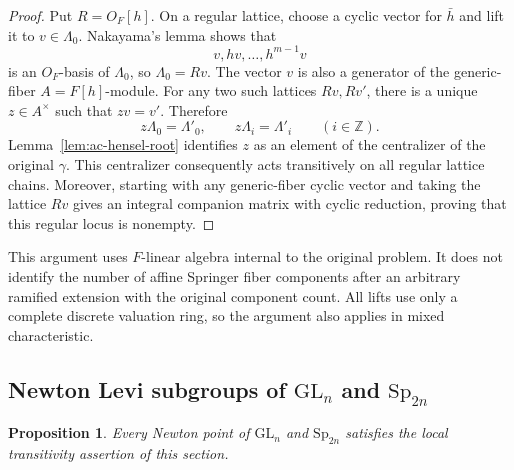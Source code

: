 \documentclass[11pt,a4paper]{article}
\newtheorem{proposition}[theorem]{Proposition}
\theoremstyle{definition}
\theoremstyle{remark}
\begin{document}
\begin{proof}
Put \(R=O_F[h]\). On a regular lattice, choose a cyclic vector for
\(\bar h\) and lift it to \(v\in\Lambda_0\). Nakayama's lemma shows that
\[
v,hv,\ldots,h^{m-1}v
\]
is an \(O_F\)-basis of \(\Lambda_0\), so \(\Lambda_0=Rv\). The vector \(v\)
is also a generator of the generic-fiber \(A=F[h]\)-module. For any two
such lattices \(Rv,Rv'\), there is a unique \(z\in A^\times\) such that
\(zv=v'\). Therefore
\[
z\Lambda_0=\Lambda'_0,\qquad
z\Lambda_i=\Lambda'_i\qquad(i\in\mathbb Z).
\]
Lemma~\ref{lem:ac-hensel-root} identifies \(z\) as an element of the
centralizer of the original \(\gamma\). This centralizer consequently
acts transitively on all regular lattice chains. Moreover, starting
with any generic-fiber cyclic vector and taking the lattice \(Rv\) gives
an integral companion matrix with cyclic reduction, proving that this
regular locus is nonempty.
\end{proof}

This argument uses \(F\)-linear algebra internal to the original problem.
It does not identify the number of affine Springer fiber components
after an arbitrary ramified extension with the original component count.
All lifts use only a complete discrete valuation ring, so the argument
also applies in mixed characteristic.

\subsection{Newton Levi subgroups of \(\mathrm{GL}_n\) and
\(\mathrm{Sp}_{2n}\)}

\begin{proposition}\label{prop:ac-gl-sp-levis}
Every Newton point of \(\mathrm{GL}_n\) and \(\mathrm{Sp}_{2n}\) satisfies
the local transitivity assertion of this section.
\end{proposition}
\end{document}
